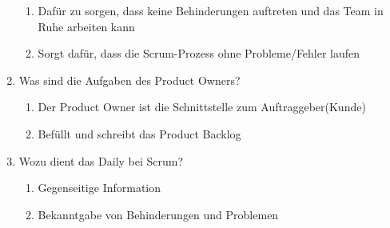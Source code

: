 \documentclass[12pt,a4paper]{article}
\begin{document}
\begin{enumerate}
	\begin{enumerate}
		\item Dafür zu sorgen, dass keine Behinderungen auftreten und das Team in Ruhe arbeiten kann
		\item Sorgt dafür, dass die Scrum-Prozess ohne Probleme/Fehler laufen
	\end{enumerate}
	\item Was sind die Aufgaben des Product Owners?
	\begin{enumerate}
		\item Der Product Owner ist die Schnittstelle zum Auftraggeber(Kunde)
		\item Befüllt und schreibt das Product Backlog
	\end{enumerate}
	\item Wozu dient das Daily bei Scrum?
	\begin{enumerate}
		\item Gegenseitige Information
		\item Bekanntgabe von Behinderungen und Problemen
	\end{enumerate}
\end{enumerate}
\end{document}
